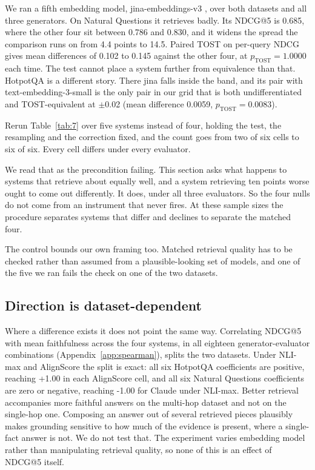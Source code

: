 \documentclass[11pt]{article}
\begin{document}
We ran a fifth embedding model, jina-embeddings-v3 \citep{sturua-etal-2024}, over both datasets and all three generators. On Natural Questions it retrieves badly. Its NDCG@5 is 0.685, where the other four sit between 0.786 and 0.830, and it widens the spread the comparison runs on from 4.4 points to 14.5. Paired TOST on per-query NDCG gives mean differences of 0.102 to 0.145 against the other four, at $p_{\mathrm{TOST}} = 1.0000$ each time. The test cannot place a system further from equivalence than that. HotpotQA is a different story. There jina falls inside the band, and its pair with text-embedding-3-small is the only pair in our grid that is both undifferentiated and TOST-equivalent at $\pm$0.02 (mean difference 0.0059, $p_{\mathrm{TOST}} = 0.0083$).

Rerun Table~\ref{tab:7} over five systems instead of four, holding the test, the resampling and the correction fixed, and the count goes from two of six cells to six of six. Every cell differs under every evaluator.

We read that as the precondition failing. This section asks what happens to systems that retrieve about equally well, and a system retrieving ten points worse ought to come out differently. It does, under all three evaluators. So the four nulls do not come from an instrument that never fires. At these sample sizes the procedure separates systems that differ and declines to separate the matched four.

The control bounds our own framing too. Matched retrieval quality has to be checked rather than assumed from a plausible-looking set of models, and one of the five we ran fails the check on one of the two datasets.


\subsection{Direction is dataset-dependent}
\label{sec:direction}

Where a difference exists it does not point the same way. Correlating NDCG@5 with mean faithfulness across the four systems, in all eighteen generator-evaluator combinations (Appendix~\ref{app:spearman}), splits the two datasets. Under NLI-max and AlignScore the split is exact: all six HotpotQA coefficients are positive, reaching +1.00 in each AlignScore cell, and all six Natural Questions coefficients are zero or negative, reaching -1.00 for Claude under NLI-max. Better retrieval accompanies more faithful answers on the multi-hop dataset and not on the single-hop one. Composing an answer out of several retrieved pieces plausibly makes grounding sensitive to how much of the evidence is present, where a single-fact answer is not. We do not test that. The experiment varies embedding model rather than manipulating retrieval quality, so none of this is an effect of NDCG@5 itself.
\end{document}
